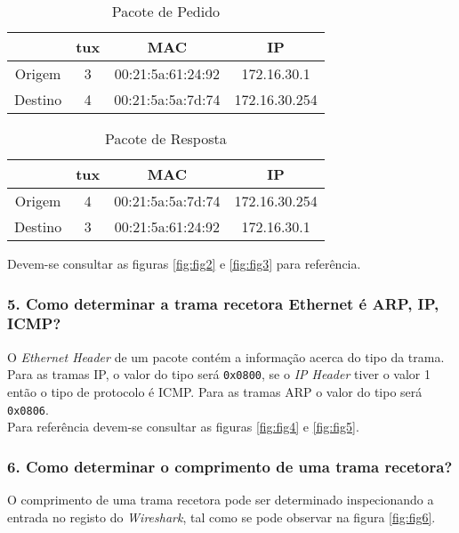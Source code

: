 \begin{table}[ht]
\begin{center}
 	\begin{tabular}{|| c | c c c||} 
 		\hline
 		& tux & MAC & IP \\ [0.5ex] 
 		\hline\hline
 		Origem & 3 & 00:21:5a:61:24:92 & 172.16.30.1 \\ 
 		\hline
 		Destino & 4 & 00:21:5a:5a:7d:74 & 172.16.30.254 \\ [1ex] 
 		\hline
	\end{tabular}
	\caption{Pacote de Pedido}
	\label{tab:table1}
\end{center}
\end{table}

\begin{table}[ht]
\begin{center}
 	\begin{tabular}{|| c | c c c||} 
 		\hline
 		& tux & MAC & IP \\ [0.5ex] 
 		\hline\hline
 		Origem & 4 & 00:21:5a:5a:7d:74 & 172.16.30.254 \\ 
 		\hline
 		Destino & 3 & 00:21:5a:61:24:92 & 172.16.30.1 \\ [1ex] 
 		\hline
	\end{tabular}
	\caption{Pacote de Resposta}
	\label{tab:table2}
\end{center}
\end{table}

Devem-se consultar as figuras \ref{fig:fig2} e \ref{fig:fig3} para referência.

\subsubsection{5. Como determinar a trama recetora Ethernet é ARP, IP, ICMP?}
O \emph{Ethernet Header} de um pacote contém a informação acerca do tipo da trama. Para as tramas IP, o valor do tipo será \verb+0x0800+, se o \emph{IP Header} tiver o valor 1 então o tipo de protocolo é ICMP. Para as tramas ARP o valor do tipo será \verb+0x0806+.\\
Para referência devem-se consultar as figuras \ref{fig:fig4} e \ref{fig:fig5}.

\subsubsection{6. Como determinar o comprimento de uma trama recetora?}
O  comprimento  de  uma  trama recetora pode ser determinado inspecionando a entrada no registo do \emph{Wireshark}, tal como se pode observar na figura \ref{fig:fig6}.